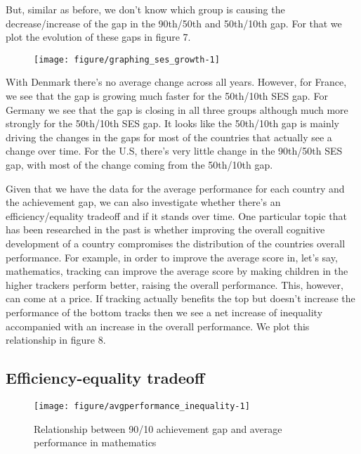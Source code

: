 \documentclass[11pt, a4paper]{article}\usepackage[]{graphicx}\usepackage[]{color}
\begin{document}
But, similar as before, we don't know which group is causing the decrease/increase of the gap in the 90th/50th and 50th/10th gap. For that we plot the evolution of these gaps in figure 7.

\begin{figure}
\begin{center}


{\centering \texttt{[image: figure/graphing\_ses\_growth-1]} 

}



\end{center}
\end{figure}

With Denmark there's no average change across all years. However, for France, we see that the gap is growing much faster for the 50th/10th SES gap. For Germany we see that the gap is closing in all three groups although much more strongly for the 50th/10th SES gap. It looks like the 50th/10th gap is mainly driving the changes in the gaps for most of the countries that actually see a change over time.  For the U.S, there's very little change in the 90th/50th SES gap, with most of the change coming from the 50th/10th gap.

Given that we have the data for the average performance for each country and the achievement gap, we can also investigate whether there's an efficiency/equality tradeoff and if it stands over time. One particular topic that has been researched in the past is whether improving the overall cognitive development of a country compromises the distribution of the countries overall performance. For example, in order to improve the average score in, let's say, mathematics, tracking can improve the average score by making children in the higher trackers perform better, raising the overall performance. This, however, can come at a price. If tracking actually benefits the top but doesn't increase the performance of the bottom tracks then we see a net increase of inequality accompanied with an increase in the overall performance. We plot this relationship in figure 8.

\subsection{Efficiency-equality tradeoff}




\begin{figure}
\begin{center}


{\centering \texttt{[image: figure/avgperformance\_inequality-1]} 

}



\caption{Relationship between 90/10 achievement gap and average performance in mathematics}
\end{center}
\end{figure}
\end{document}

